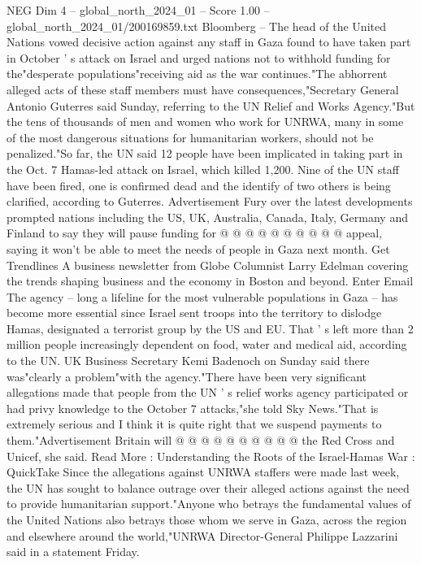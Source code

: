 \begin{textsample}{NEG Dim 4 – global\_north\_2024\_01 – Score 1.00 – global\_north\_2024\_01/200169859.txt}  \label{ex:f4_neg_116}
Bloomberg -- The head of the United Nations vowed decisive action against any staff in Gaza found to have taken part in October ' s attack on Israel and urged nations not to withhold funding for the"desperate populations"receiving aid as the war continues."The abhorrent alleged acts of these staff members must have consequences,"Secretary General Antonio Guterres said Sunday, referring to the UN Relief and Works Agency."But the tens of thousands of men and women who work for UNRWA, many in some of the most dangerous situations for humanitarian workers, should not be penalized."So far, the UN said 12 people have been implicated in taking part in the Oct. 7 Hamas-led attack on Israel, which killed 1,200.
Nine of the UN staff have been fired, one is confirmed dead and the identify of two others is being clarified, according to Guterres.
Advertisement Fury over the latest developments prompted nations including the US, UK, Australia, Canada, Italy, Germany and Finland to say they will pause funding for @ @ @ @ @ @ @ @ @ @ appeal, saying it won't be able to meet the needs of people in Gaza next month.
Get Trendlines A business newsletter from Globe Columnist Larry Edelman covering the trends shaping business and the economy in Boston and beyond.
Enter Email The agency -- long a lifeline for the most vulnerable populations in Gaza -- has become more essential since Israel sent troops into the territory to dislodge Hamas, designated a terrorist group by the US and EU.
That ' s left more than 2 million people increasingly dependent on food, water and medical aid, according to the UN.
UK Business Secretary Kemi Badenoch on Sunday said there was"clearly a problem"with the agency."There have been very significant allegations made that people from the UN ' s relief works agency participated or had privy knowledge to the October 7 attacks,"she told Sky News."That is extremely serious and I think it is quite right that we suspend payments to them."Advertisement Britain will @ @ @ @ @ @ @ @ @ @ the Red Cross and Unicef, she said.
Read More : Understanding the Roots of the Israel-Hamas War : QuickTake Since the allegations against UNRWA staffers were made last week, the UN has sought to balance outrage over their alleged actions against the need to provide humanitarian support."Anyone who betrays the fundamental values of the United Nations also betrays those whom we serve in Gaza, across the region and elsewhere around the world,"UNRWA Director-General Philippe Lazzarini said in a statement Friday.

\end{textsample}
